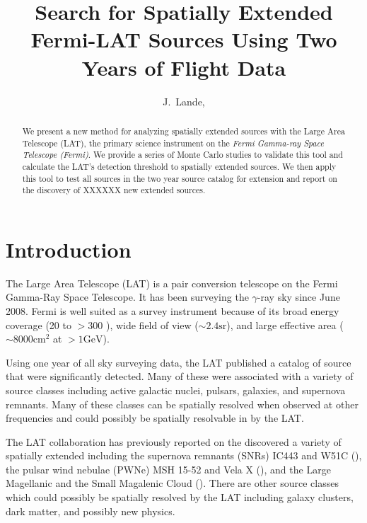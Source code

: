\documentclass[12pt,preprint]{aastex}
\newcommand{\mev}{\text{MeV}\xspace}
\newcommand{\gev}{\text{GeV}\xspace}
\newcommand{\sr}{\text{sr}\xspace}
\newcommand{\cm}{\text{cm}\xspace}
\begin{document}
\title{Search for Spatially Extended Fermi-LAT Sources Using Two Years of Flight
Data}

\author{
J.~Lande, 
}


\begin{abstract}
We present a new method for analyzing spatially extended sources with
the Large Area Telescope (LAT), the primary science instrument
on the {\em Fermi Gamma-ray Space Telescope (Fermi)}.  We provide a
series of Monte Carlo studies to validate this tool
and calculate the LAT's detection threshold to spatially extended
sources.  We then apply this tool to test all sources in the two
year source catalog for extension and report on the discovery
of XXXXXX new extended sources.
\end{abstract}

\section{Introduction}


The Large Area Telescope (LAT) is a pair conversion telescope on the
Fermi Gamma-Ray Space Telescope. It has been surveying the $\gamma$-ray
sky since June 2008.  Fermi is well suited as a survey
instrument because of its broad energy coverage (20 \mev
to $>300$ \gev), wide field of view ($\sim 2.4 \sr$), and large effective
area ($\sim 8000 \cm^2$ at $>1 \gev$).

Using one year of all sky surveying data, the LAT published a catalog of
source that were significantly detected.  Many of these were associated
with a variety of source classes including active galactic nuclei,
pulsars, galaxies, and supernova remnants.  Many of these classes can be
spatially resolved when observed at other frequencies and could possibly
be spatially resolvable in \gev by the LAT.

The LAT collaboration has previously reported on the discovered
a variety of spatially extended including the supernova remnants (SNRs)
IC443 and W51C (\cite{ic443,w51c}),
the pulsar wind nebulae (PWNe) MSH 15-52 and Vela X
(\cite{msh1552,velax}), and the Large Magellanic
and the Small Magalenic Cloud (\cite{lmc,smc}).  There are other
source classes which could possibly be spatially resolved by the LAT
including galaxy clusters, dark matter, and possibly new physics.
\end{document}
